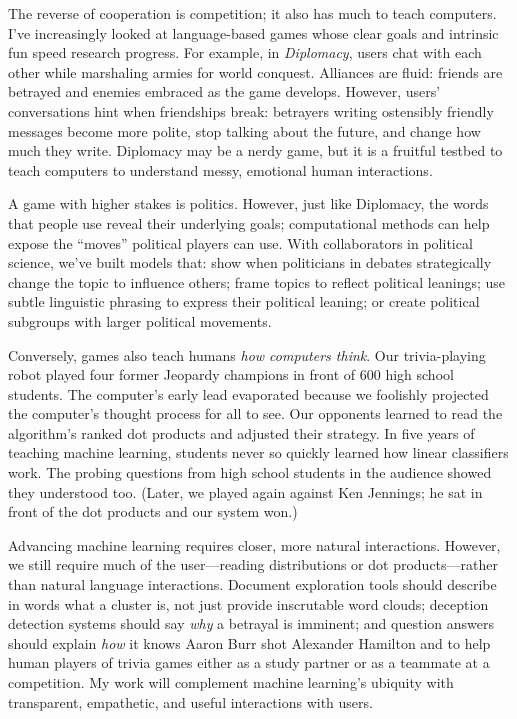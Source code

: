 \documentclass[11pt, amssymb, one column]{article}
\begin{document}
The reverse of cooperation is competition; it also has much to teach
computers. I've increasingly looked at language-based games whose clear goals
and intrinsic fun speed research progress.  For example, in \emph{Diplomacy},
users chat with each other while marshaling armies for world conquest.
Alliances are fluid: friends are betrayed and enemies embraced as the game
develops. However, users' conversations hint when friendships break:
betrayers writing ostensibly friendly messages become more
polite, stop talking about the future, and change how much they
write.  Diplomacy may be a nerdy game, but it is a fruitful
testbed to teach computers to understand messy, emotional human interactions.

A game with higher stakes is politics.  However, just like Diplomacy,
the words that people use reveal their underlying goals; computational
methods can help expose the ``moves'' political players can use.  With
collaborators in political science, we've built models that: show when
politicians in debates strategically change the topic to influence
others; frame topics to reflect political leanings; use subtle
linguistic phrasing to express their political leaning; or create
political subgroups with larger political movements.

Conversely, games also teach humans \emph{how computers think}.  Our
trivia-playing robot played four former Jeopardy champions
in front of 600 high school students. The computer's early
lead evaporated because we foolishly projected the computer's thought process for
all to see.  Our opponents learned to read the algorithm's ranked dot
products and adjusted their strategy. In five years
of teaching machine learning, students never so
quickly learned how linear classifiers work.  The probing questions from
high school students in the audience showed they understood too.
(Later, we played again against Ken Jennings; he sat in front of
the dot products and our system won.)

Advancing machine learning requires closer, more natural interactions.
However, we still require much of the user---reading distributions or
dot products---rather than natural language interactions.  Document
exploration tools should describe in words what a cluster is, not just
provide inscrutable word clouds; deception detection systems should
say \emph{why} a betrayal is imminent; and question answers should
explain \emph{how} it knows Aaron Burr shot Alexander Hamilton and to
help human players of trivia games either as a study partner or as a
teammate at a competition. My work will complement machine learning's
ubiquity with transparent, empathetic, and useful interactions with
users.
\end{document}

